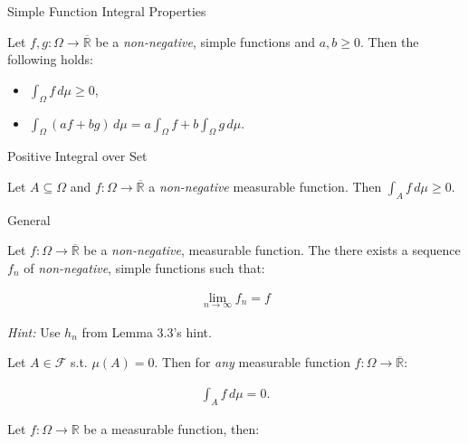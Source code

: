 \documentclass[10pt,landscape]{article}
\renewcommand{\geq}{\geqslant}
\newcommand{\Hint}{\textit{Hint: }}
\newcommand{\CalF}{\mathcal{F}}
\begin{document}
\begin{multicols}{3}
\begin{lemma}{}{Simple Function Integral Properties}

    Let $f,g: \Omega \to \overline{\mathbb{R}}$ be a \emph{non-negative}, simple functions and $a,b \geq 0$. Then the following holds:

    \begin{itemize}
        \item $\int_{\Omega} f \, d\mu \geq 0$,
        \item $\int_{\Omega} (af + bg) \, d\mu = a\int_{\Omega} f + b\int_{\Omega}g \, d\mu$.
    \end{itemize}

\end{lemma}

\begin{corollary}{}{Positive Integral over Set}

    Let $A \subseteq \Omega$ and $f: \Omega \to \overline{\mathbb{R}}$ a \emph{non-negative} measurable function. Then $\int_A f \, d\mu \geq 0$.

\end{corollary}

\begin{lemma}{3.3}{General}

    Let $f: \Omega \to \overline{\mathbb{R}}$ be a \emph{non-negative}, measurable function. The there exists a sequence $f_n$ of \emph{non-negative}, simple functions such that:

    \begin{align*}
        \lim_{n \to \infty} f_n = f
    \end{align*}

    \Hint Use $h_n$ from Lemma 3.3's hint.

\end{lemma}

\begin{exercise}{3.5}{}

    Let $A \in \CalF$ s.t. $\mu(A) = 0$. Then for \emph{any} measurable function $f: \Omega \to \overline{\mathbb{R}}$:
    
        \begin{align*}
            \int_A f \,d\mu = 0.
        \end{align*}

\end{exercise}

\begin{exercise}{3.6}{}

    Let $f: \Omega \to \mathbb{R}$ be a measurable function, then:


\end{exercise}
\end{multicols}
\end{document}
